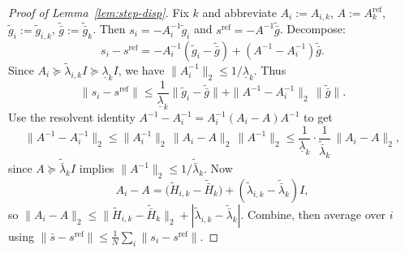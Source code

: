 \documentclass[review,onefignum,onetabnum]{siamart171218}
\begin{document}
	\begin{proof}[Proof of Lemma~\ref{lem:step-disp}]
		Fix $k$ and abbreviate $A_i:=A_{i,k}$, $A:=A_k^{\mathrm{ref}}$, $\tilde g_i:=\tilde g_{i,k}$, $\tilde{\bar g}:=\tilde{\bar g}_k$.
		Then $s_i=-A_i^{-1}\tilde g_i$ and $s^{\mathrm{ref}}=-A^{-1}\tilde{\bar g}$.
		Decompose:
		\[
		s_i-s^{\mathrm{ref}}
		=-A_i^{-1}(\tilde g_i-\tilde{\bar g}) + (A^{-1}-A_i^{-1})\tilde{\bar g}.
		\]
		Since $A_i\succeq \tilde\lambda_{i,k}I\succeq \underline\lambda_k I$, we have $\|A_i^{-1}\|_2\le 1/\underline\lambda_k$.
		Thus
		\[
		\|s_i-s^{\mathrm{ref}}\|
		\le \frac1{\underline\lambda_k}\|\tilde g_i-\tilde{\bar g}\|+\|A^{-1}-A_i^{-1}\|_2\,\|\tilde{\bar g}\|.
		\]
		Use the resolvent identity $A^{-1}-A_i^{-1}=A_i^{-1}(A_i-A)A^{-1}$ to get
		\[
		\|A^{-1}-A_i^{-1}\|_2\le \|A_i^{-1}\|_2\,\|A_i-A\|_2\,\|A^{-1}\|_2
		\le \frac1{\underline\lambda_k}\cdot \frac1{\tilde{\bar\lambda}_k}\,\|A_i-A\|_2,
		\]
		since $A\succeq \tilde{\bar\lambda}_k I$ implies $\|A^{-1}\|_2\le 1/\tilde{\bar\lambda}_k$.
		Now
		\[
		A_i-A=\big(\tilde H_{i,k}-\tilde{\bar H}_k\big)+(\tilde\lambda_{i,k}-\tilde{\bar\lambda}_k)I,
		\]
		so $\|A_i-A\|_2\le \|\tilde H_{i,k}-\tilde{\bar H}_k\|_2+|\tilde\lambda_{i,k}-\tilde{\bar\lambda}_k|$.
		Combine, then average over $i$ using $\|\bar s-s^{\mathrm{ref}}\|\le \frac1N\sum_i\|s_i-s^{\mathrm{ref}}\|$.
	\end{proof}
	
\end{document}

